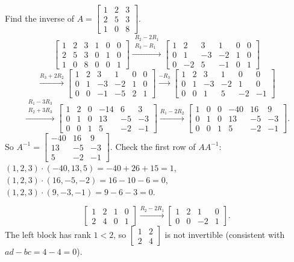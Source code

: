 \begin{example}
Find the inverse of $A=\begin{bmatrix}1&2&3\\2&5&3\\1&0&8\end{bmatrix}$.
\[
\left[\begin{array}{ccc|ccc} 1&2&3&1&0&0\\ 2&5&3&0&1&0\\ 1&0&8&0&0&1\end{array}\right]
\xrightarrow{\substack{R_2-2R_1\\R_3-R_1}}
\left[\begin{array}{ccc|ccc} 1&2&3&1&0&0\\ 0&1&-3&-2&1&0\\ 0&-2&5&-1&0&1\end{array}\right]
\]
\[
\xrightarrow{R_3+2R_2}
\left[\begin{array}{ccc|ccc} 1&2&3&1&0&0\\ 0&1&-3&-2&1&0\\ 0&0&-1&-5&2&1\end{array}\right]
\xrightarrow{-R_3}
\left[\begin{array}{ccc|ccc} 1&2&3&1&0&0\\ 0&1&-3&-2&1&0\\ 0&0&1&5&-2&-1\end{array}\right]
\]
\[
\xrightarrow{\substack{R_1-3R_3\\R_2+3R_3}}
\left[\begin{array}{ccc|ccc} 1&2&0&-14&6&3\\ 0&1&0&13&-5&-3\\ 0&0&1&5&-2&-1\end{array}\right]
\xrightarrow{R_1-2R_2}
\left[\begin{array}{ccc|ccc} 1&0&0&-40&16&9\\ 0&1&0&13&-5&-3\\ 0&0&1&5&-2&-1\end{array}\right].
\]
So $A^{-1}=\begin{bmatrix}-40&16&9\\13&-5&-3\\5&-2&-1\end{bmatrix}$. Check the first row of $AA^{-1}$:
$(1,2,3)\cdot(-40,13,5)=-40+26+15=1$, $(1,2,3)\cdot(16,-5,-2)=16-10-6=0$,
$(1,2,3)\cdot(9,-3,-1)=9-6-3=0$.
\end{example}

\begin{example}
\[
\left[\begin{array}{cc|cc} 1&2&1&0\\ 2&4&0&1\end{array}\right]
\xrightarrow{R_2-2R_1}
\left[\begin{array}{cc|cc} 1&2&1&0\\ 0&0&-2&1\end{array}\right].
\]
The left block has rank $1<2$, so $\begin{bmatrix}1&2\\2&4\end{bmatrix}$ is not invertible (consistent
with $ad-bc=4-4=0$).
\end{example}

